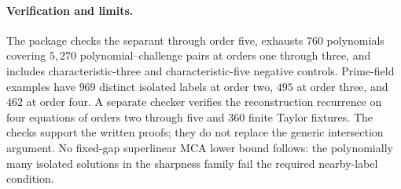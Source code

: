 \paragraph{Verification and limits.}
The package  checks the
separant through order five, exhausts $760$ polynomials covering
$5{,}270$ polynomial--challenge pairs at orders one through three,
and includes characteristic-three and characteristic-five negative
controls. Prime-field examples have $969$ distinct isolated labels
at order two, $495$ at order three, and $462$ at order four.
A separate checker verifies the reconstruction recurrence on four
equations of orders two through five and $360$ finite Taylor fixtures.
The checks support the written proofs; they do not replace the generic
intersection argument. No fixed-gap superlinear MCA lower bound follows:
the polynomially many isolated solutions in the sharpness family fail
the required nearby-label condition.



